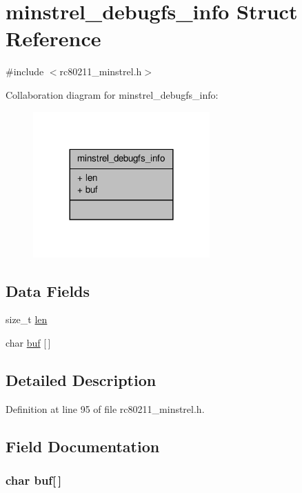 \hypertarget{structminstrel__debugfs__info}{\section{minstrel\-\_\-debugfs\-\_\-info Struct Reference}
\label{structminstrel__debugfs__info}
}


{\ttfamily \#include $<$rc80211\-\_\-minstrel.\-h$>$}



Collaboration diagram for minstrel\-\_\-debugfs\-\_\-info\-:
\nopagebreak
\begin{figure}[H]
\begin{center}
\leavevmode
\includegraphics[width=192pt]{structminstrel__debugfs__info__coll__graph}
\end{center}
\end{figure}
\subsection*{Data Fields}
\begin{DoxyCompactItemize}
\item 
size\-\_\-t \hyperlink{structminstrel__debugfs__info_a7360b55975153b822efc5217b7734e6a}{len}
\item 
char \hyperlink{structminstrel__debugfs__info_a781718f5b53a876fe91c424c4607fa8f}{buf} \mbox{[}$\,$\mbox{]}
\end{DoxyCompactItemize}


\subsection{Detailed Description}


Definition at line 95 of file rc80211\-\_\-minstrel.\-h.



\subsection{Field Documentation}
\hypertarget{structminstrel__debugfs__info_a781718f5b53a876fe91c424c4607fa8f}{
\subsubsection[{buf}]{\setlength{\rightskip}{0pt plus 5cm}char buf\mbox{[}$\,$\mbox{]}}}\label{structminstrel__debugfs__info_a781718f5b53a876fe91c424c4607fa8f}


